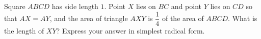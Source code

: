 Square $ABCD$ has side length $1$. Point $X$ lies on $BC$ and point $Y$ lies on $CD$ so that $AX=AY$, and the area of triangle $AXY$ is $\dfrac{1}{4}$ of the area of $ABCD$. What is the length of $XY$? Express your answer in simplest radical form.
